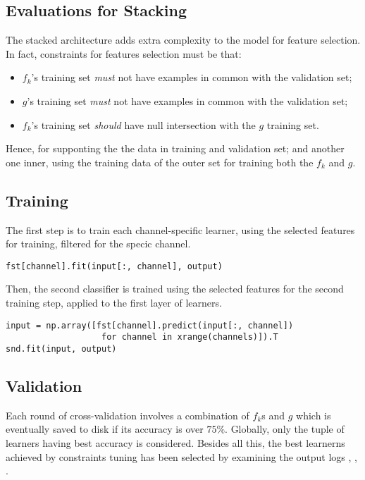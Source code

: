 \documentclass[10pt]{article}
\begin{document}
\subsection{Evaluations for Stacking}

The stacked architecture adds extra complexity to the model for feature selection. In fact, constraints for features selection must be that: 
\begin{itemize}
\item $f_k$'s training set \emph{must} not have examples in common with the validation set;
\item $g$'s training set \emph{must} not have examples in common with the validation set;
\item $f_k$'s training set \emph{should} have null intersection with the $g$ training set.
\end{itemize}

Hence, for supponting the the data in training and validation set; and another one inner, using the training data of the outer set for training both the $f_k$ and $g$. 

\subsection{Training}

The first step is to train each channel-specific learner, using the selected features for training, filtered for the specic channel. 
\begin{verbatim}
fst[channel].fit(input[:, channel], output)
\end{verbatim}

\noindent
Then, the second classifier is trained using the selected features for the second training step, applied to the first layer of learners.
\begin{verbatim}
input = np.array([fst[channel].predict(input[:, channel])
                   for channel in xrange(channels)]).T
snd.fit(input, output)

\end{verbatim}


\subsection{Validation}
Each round of cross-validation involves a combination of $f_k$s and $g$ which is eventually saved to disk if its accuracy is over $75\%$. 
Globally, only the tuple of learners having best accuracy is considered.
Besides all this, the best learnerns achieved by constraints tuning has been selected by examining the output logs , , .
\end{document}
